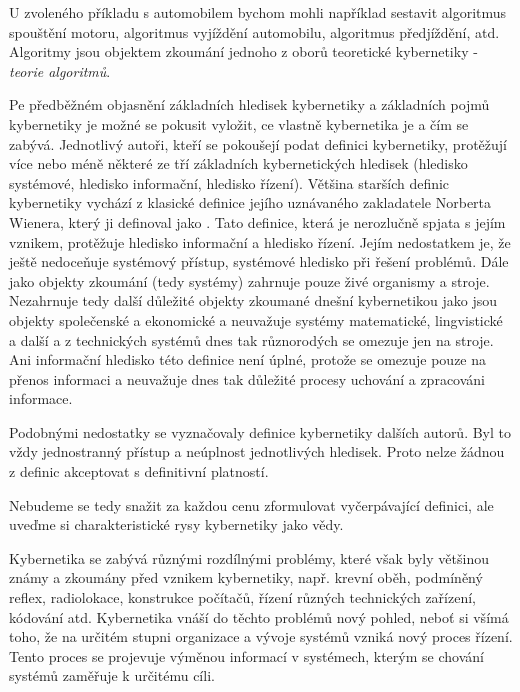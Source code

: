       U zvoleného příkladu s automobilem bychom mohli například sestavit algoritmus spouštění 
      motoru, algoritmus vyjíždění automobilu, algoritmus předjíždění, atd. Algoritmy jsou objektem 
      zkoumání jednoho z oborů teoretické kybernetiky - \emph{teorie algoritmů}.
      
      Pe předběžném objasnění základních hledisek kybernetiky a základních pojmů kybernetiky je 
      možné se pokusit vyložit, ce vlastně kybernetika je a čím se zabývá. Jednotlivý autoři, kteří 
      se pokoušejí podat definici kybernetiky, protěžují více nebo méně některé ze tří základních 
      kybernetických hledisek (hledisko systémové, hledisko informační, hledisko řízení). Většina 
      starších definic kybernetiky vychází z klasické definice jejího uznávaného zakladatele 
      Norberta Wienera, který ji definoval jako . Tato definice, která je nerozlučně spjata s jejím vznikem, protěžuje hledisko 
      informační a hledisko řízení. Jejím nedostatkem je, že ještě nedoceňuje systémový přístup, 
      systémové hledisko při řešení problémů. Dále jako objekty zkoumání (tedy systémy) zahrnuje 
      pouze živé organismy a stroje. Nezahrnuje tedy další důležité objekty zkoumané dnešní 
      kybernetikou jako jsou objekty společenské a ekonomické a neuvažuje systémy matematické, 
      lingvistické a další a z technických systémů dnes tak různorodých se omezuje jen na stroje. 
      Ani informační hledisko této definice není úplné, protože se omezuje pouze na přenos 
      informaci a neuvažuje dnes tak důležité procesy uchování a zpracováni informace.
      
      Podobnými nedostatky se vyznačovaly definice kybernetiky dalších autorů. Byl to vždy 
      jednostranný přístup a neúplnost jednotlivých hledisek. Proto nelze žádnou z definic 
      akceptovat s definitivní platností.
      
      Nebudeme se tedy snažit za každou cenu zformulovat vyčerpávající definici, ale uveďme si 
      charakteristické rysy kybernetiky jako vědy.
      
      Kybernetika se zabývá různými rozdílnými problémy, které však byly většinou známy a zkoumány 
      před vznikem kybernetiky, např. krevní oběh, podmíněný reflex, radiolokace, konstrukce 
      počítačů, řízení různých technických zařízení, kódování atd. Kybernetika vnáší do těchto 
      problémů nový pohled, neboť si všímá toho, že na určitém stupni organizace a vývoje systémů 
      vzniká nový proces řízení. Tento proces se projevuje výměnou informací v systémech, kterým se 
      chování systémů zaměřuje k určitému cíli.
      
